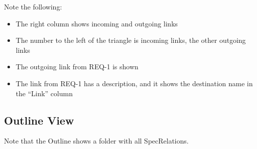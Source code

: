 Note the following:

\begin{itemize}
\item
  The right column shows incoming and outgoing links
\item
  The number to the left of the triangle is incoming links, the other outgoing links
\item
  The outgoing link from REQ-1 is shown
\item
  The link from REQ-1 has a description, and it shows the destination name in the ``Link'' column
\end{itemize}

\subsection{Outline View}

Note that the Outline shows a folder with all SpecRelations.

